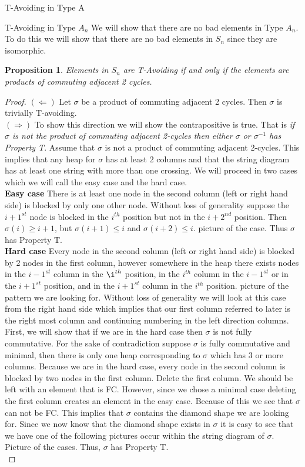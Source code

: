 \documentclass[11pt]{amsart}
\newtheorem{proposition}[theorem]{Proposition}
\theoremstyle{definition}
\numberwithin{equation}{section}
\renewcommand{\(}{\left(}
\renewcommand{\)}{\right)}
\begin{document}
\begin{section}{T-Avoiding in Type A}
\begin{subsection}{T-Avoiding in Type \textbf{$A_n$}}
We will show that there are no bad elements in Type $A_n$. To do this we will show that there are no bad elements in $S_n$ since they are isomorphic.
\begin{proposition}
Elements in $S_n$ are T-Avoiding if and only if the elements are products of commuting adjacent 2 cycles.
\end{proposition}
\begin{proof}
$(\Leftarrow)$ Let $\sigma$ be a product of commuting adjacent 2 cycles. Then $\sigma$ is trivially T-avoiding.\\
$(\Rightarrow)$ To show this direction we will show the contrapositive is true. That is \emph{if $\sigma$ is not the product of commuting adjacent 2-cycles then either $\sigma$ or $\sigma^{-1}$ has Property T}. Assume that $\sigma$ is not a product of commuting adjacent 2-cycles. This implies that any heap for $\sigma$ has at least 2 columns and that the string diagram has at least one string with more than one crossing. We will proceed in two cases which we will call the easy case and the hard case. \\
\textbf{Easy case} There is at least one node in the second column (left or right hand side) is blocked by only one other node. Without loss of generality suppose the $i+1^{st}$ node is blocked in the $i^{th}$ position but not in the $i+2^{nd}$ position. Then $\sigma(i) \geq i+1$, but $\sigma(i+1) \leq i$ and $\sigma(i+2) \leq i$. {\color{red} picture of the case}. Thus $\sigma$ has Property T.\\
\textbf{Hard case} Every node in the second column (left or right hand side) is blocked by 2 nodes in the first column, however somewhere in the heap there exists nodes in the $i-1^{st}$ column in the $\i^{th}$ position, in the $i^{th}$ column in the $i-1^{st}$ or in the $i+1^{st}$ position, and in the $i+1^{st}$ column in the $i^{th}$ position. {\color{red} picture of the pattern we are looking for}. Without loss of generality we will look at this case from the right hand side which implies that our first column referred to later is the right most column and continuing numbering in the left direction columns. First, we will show that if we are in the hard case then $\sigma$ is not fully commutative. For the sake of contradiction suppose $\sigma$ is fully commutative and minimal, then there is only one heap corresponding to $\sigma$ which has 3 or more columns. Because we are in the hard case, every node in the second column is blocked by two nodes in the first column. Delete the first column. We should be left with an element that is FC. However, since we chose a minimal case deleting the first column creates an element in the easy case. Because of this we see that $\sigma$ can not be FC. This implies that $\sigma$ contains the diamond shape we are looking for. Since we now know that the diamond shape exists in $\sigma$ it is easy to see that we have one of the following pictures occur within the string diagram of $\sigma$. {\color{red} Picture of the cases}. Thus, $\sigma$ has Property T.\\

\end{proof}
\end{subsection}
\end{section}
\end{document}
